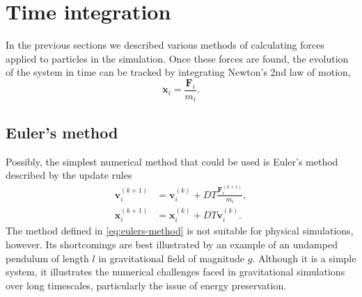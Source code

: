 \section{Time integration}
In the previous sections we described various methods of calculating forces applied to particles in the simulation.
Once these forces are found, the evolution of the system in time can be tracked by integrating Newton's 2nd law of motion,
\begin{equation}\label{eq:newtons-second}
    \ddot{\mathbf{x}}_i = \frac{\mathbf{F}_i}{m_i}.
\end{equation}

\subsection{Euler's method}
Possibly, the simplest numerical method that could be used is Euler's method described by the update rules
\begin{equation}\label{eq:eulers-method}
    \begin{aligned}
        \mathbf{v}_i^{(k+1)} & = \mathbf{v}_i^{(k)} + DT \frac{\mathbf{F}^{(k+1)}_i}{m_i}, \\
        \mathbf{x}_i^{(k+1)} & = \mathbf{x}_i^{(k)} + DT \mathbf{v}_i^{(k)}.
    \end{aligned}
\end{equation}
The method defined in \autoref{eq:eulers-method} is not suitable for physical simulations, however.
Its shortcomings are best illustrated by an example of an undamped pendulum of length $l$ in gravitational field of magnitude $g$.
Although it is a simple system, it illustrates the numerical challenges faced in gravitational simulations over long timescales, particularly the issue of energy preservation.

